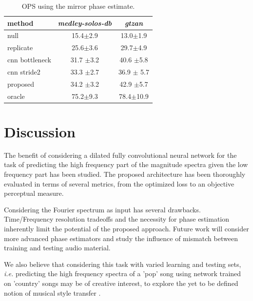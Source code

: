 \documentclass{article}
\begin{document}
\begin{table}[t]
  \caption{OPS using the mirror phase estimate.}
  \label{tab:OPS}
\begin{center}
\begin{tabular}{lcc}
method & \textit{medley-solos-db} & \textit{gtzan} \\
\hline
null & 15.4$\pm$2.9 & 13.0$\pm$1.9  \\
replicate & 25.6$\pm$3.6 & 29.7$\pm$4.9 \\
\hline
cnn bottleneck & 31.7 $\pm$3.2 & 40.6 $\pm$5.8 \\
cnn stride2 & 33.3 $\pm$2.7 & 36.9 $\pm$ 5.7 \\
\hline
proposed & 34.2 $\pm$3.2 & 42.9 $\pm$5.7 \\
\hline
oracle  & 75.2$\pm$9.3 & 78.4$\pm$10.9  \\
\end{tabular}
\end{center}
\vspace{-4mm}
\end{table}

\section{Discussion}
\label{sec:discussion}

The benefit of considering a dilated fully convolutional neural network for the task of predicting the high frequency part of the magnitude spectra given the low frequency part has been studied. The proposed architecture has been thoroughly evaluated in terms of several metrics, from the optimized loss to an objective perceptual measure.

Considering the Fourier spectrum as input has several drawbacks. Time/Frequency resolution tradeoffs and the necessity for phase estimation inherently limit the potential of the proposed approach. Future work will consider more advanced phase estimators and study the influence of mismatch between training and testing audio material. 

We also believe that considering this task with varied learning and testing sets, \textit{i.e.} predicting the high frequency spectra of a 'pop' song using network trained on 'country' songs may be of creative interest, to explore the yet to be defined notion of musical style transfer \cite{dai2018music}.


\vfill\pagebreak




\end{document}
